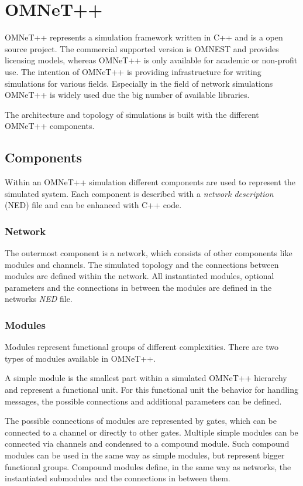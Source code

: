 \chapter{OMNeT++}

\label{sec:OMNeT}
OMNeT++ represents a simulation framework written in C++ and is a open source project.
The commercial supported version is OMNEST and provides licensing models, whereas OMNeT++ is only available for academic or non-profit use.
The intention of OMNeT++ is providing infrastructure for writing simulations for various fields.
Especially in the field of network simulations OMNeT++ is widely used due the big number of available libraries.

The architecture and topology of simulations is built with the different OMNeT++ components.

\section{Components}
Within an OMNeT++ simulation different components are used to represent the simulated system.
Each component is described with a \emph{network description} (NED) file and can be enhanced with C++ code.

\subsection{Network}
The outermost component is a network, which consists of other components like modules and channels.
The simulated topology and the connections between modules are defined within the network.
All instantiated modules, optional parameters and the connections in between the modules are defined in the networks \emph{NED} file. \cite[section 3.2.1]{omnet_manual}

\subsection{Modules}
Modules represent functional groups of different complexities.
There are two types of modules available in OMNeT++.

A simple module is the smallest part within a simulated OMNeT++ hierarchy and represent a functional unit.
For this functional unit the behavior for handling messages, the possible connections and additional parameters can be defined. \cite[section 3.3]{omnet_manual}

The possible connections of modules are represented by gates, which can be connected to a channel or directly to other gates.
Multiple simple modules can be connected via channels and condensed to a compound module.
Such compound modules can be used in the same way as simple modules, but represent bigger functional groups.
Compound modules define, in the same way as networks, the instantiated submodules and the connections in between them. \cite[section 3.4]{omnet_manual}
\\

